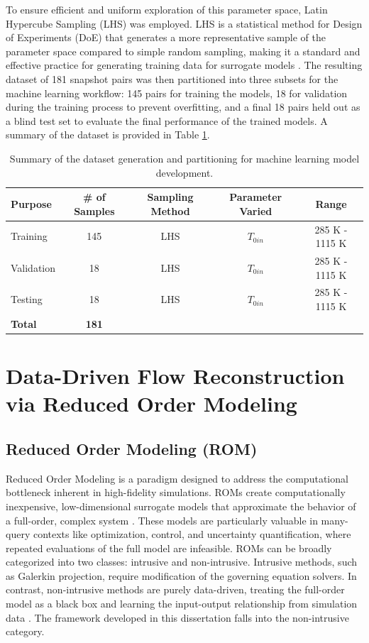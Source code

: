 \documentclass[tg, EN]{ufabcFHZh_tg}
\begin{document}
To ensure efficient and uniform exploration of this parameter space, Latin Hypercube Sampling (LHS) was employed. LHS is a statistical method for Design of Experiments (DoE) that generates a more representative sample of the parameter space compared to simple random sampling, making it a standard and effective practice for generating training data for surrogate models \citep{yu2019}. The resulting dataset of 181 snapshot pairs was then partitioned into three subsets for the machine learning workflow: 145 pairs for training the models, 18 for validation during the training process to prevent overfitting, and a final 18 pairs held out as a blind test set to evaluate the final performance of the trained models. A summary of the dataset is provided in Table \ref{tab:dataset_summary}.

\begin{table}[H]
\centering
\caption{Summary of the dataset generation and partitioning for machine learning model development.}
\label{tab:dataset_summary}
\begin{tabular}{lcccc}
\toprule
\textbf{Purpose} & \textbf{\# of Samples} & \textbf{Sampling Method} & \textbf{Parameter Varied} & \textbf{Range} \\
\midrule
Training & 145 & LHS &  $T_{0in}$ & 285 K - 1115 K \\
Validation & 18 & LHS & $T_{0in}$ & 285 K - 1115 K \\
Testing & 18 & LHS &  $T_{0in}$ & 285 K - 1115 K \\
\midrule
\textbf{Total} & \textbf{181} & & & \\
\bottomrule
\end{tabular}
\end{table}


\chapter{Data-Driven Flow Reconstruction via Reduced Order Modeling}
\label{chap:rom_framework}

\section{Reduced Order Modeling (ROM)}

Reduced Order Modeling is a paradigm designed to address the computational bottleneck inherent in high-fidelity simulations. ROMs create computationally inexpensive, low-dimensional surrogate models that approximate the behavior of a full-order, complex system \citep{brunton2019, stabile2021}. These models are particularly valuable in many-query contexts like optimization, control, and uncertainty quantification, where repeated evaluations of the full model are infeasible. ROMs can be broadly categorized into two classes: intrusive and non-intrusive. Intrusive methods, such as Galerkin projection, require modification of the governing equation solvers. In contrast, non-intrusive methods are purely data-driven, treating the full-order model as a black box and learning the input-output relationship from simulation data \citep{hesthaven2016, benner2015}. The framework developed in this dissertation falls into the non-intrusive category.
\end{document}
